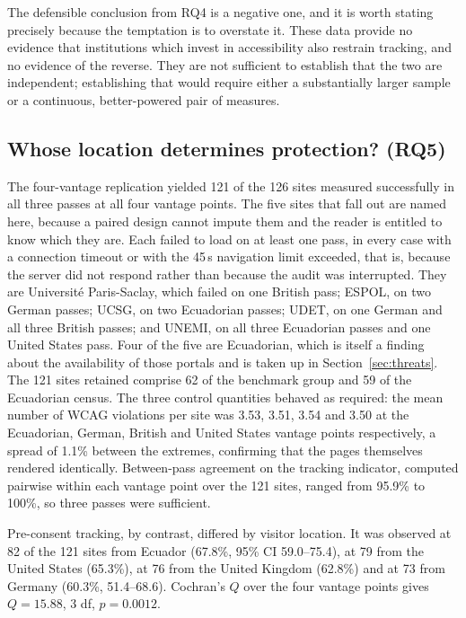 \documentclass[pdflatex,sn-basic,Numbered,iicol]{sn-jnl}
\theoremstyle{thmstyleone}
\theoremstyle{thmstyletwo}
\theoremstyle{thmstylethree}
\begin{document}
	The defensible conclusion from RQ4 is a negative one, and it is worth stating precisely because the temptation is to overstate it. These data provide no evidence that institutions which invest in accessibility also restrain tracking, and no evidence of the reverse. They are not sufficient to establish that the two are independent; establishing that would require either a substantially larger sample or a continuous, better-powered pair of measures.
	
	\subsection{Whose location determines protection? (RQ5)}\label{sec:results-vantage}
	
	The four-vantage replication yielded 121 of the 126 sites measured successfully in all three passes at all four vantage points. The five sites that fall out are named here, because a paired design cannot impute them and the reader is entitled to know which they are. Each failed to load on at least one pass, in every case with a connection timeout or with the 45\,s navigation limit exceeded, that is, because the server did not respond rather than because the audit was interrupted. They are Universit\'e Paris-Saclay, which failed on one British pass; ESPOL, on two German passes; UCSG, on two Ecuadorian passes; UDET, on one German and all three British passes; and UNEMI, on all three Ecuadorian passes and one United States pass. Four of the five are Ecuadorian, which is itself a finding about the availability of those portals and is taken up in Section~\ref{sec:threats}. The 121 sites retained comprise 62 of the benchmark group and 59 of the Ecuadorian census. The three control quantities behaved as required: the mean number of WCAG violations per site was 3.53, 3.51, 3.54 and 3.50 at the Ecuadorian, German, British and United States vantage points respectively, a spread of 1.1\% between the extremes, confirming that the pages themselves rendered identically. Between-pass agreement on the tracking indicator, computed pairwise within each vantage point over the 121 sites, ranged from 95.9\% to 100\%, so three passes were sufficient.
	
	Pre-consent tracking, by contrast, differed by visitor location. It was observed at 82 of the 121 sites from Ecuador (67.8\%, 95\% CI 59.0--75.4), at 79 from the United States (65.3\%), at 76 from the United Kingdom (62.8\%) and at 73 from Germany (60.3\%, 51.4--68.6). Cochran's $Q$ over the four vantage points gives $Q=15.88$, 3 df, $p=0.0012$.
	
\end{document}
